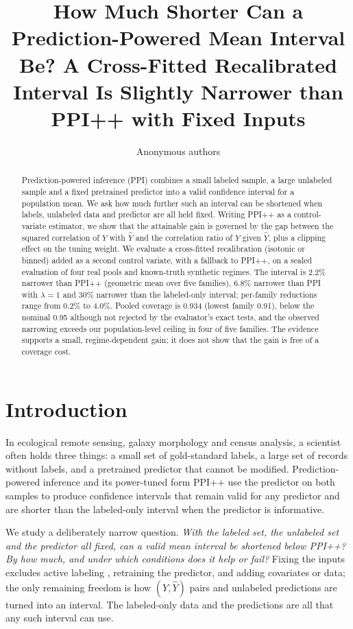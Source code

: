 \documentclass{article}
\title{How Much Shorter Can a Prediction-Powered Mean Interval Be? A Cross-Fitted Recalibrated Interval Is Slightly Narrower than PPI++ with Fixed Inputs}
\author{Anonymous authors}
\newcommand{\Yhat}{\hat Y}
\begin{document}
\maketitle

\begin{abstract}
Prediction-powered inference (PPI) combines a small labeled sample, a large unlabeled sample and a fixed pretrained predictor into a valid confidence interval for a population mean. We ask how much further such an interval can be shortened when labels, unlabeled data and predictor are all held fixed. Writing PPI++ as a control-variate estimator, we show that the attainable gain is governed by the gap between the squared correlation of $Y$ with $\Yhat$ and the correlation ratio of $Y$ given $\Yhat$, plus a clipping effect on the tuning weight. We evaluate a cross-fitted recalibration (isotonic or binned) added as a second control variate, with a fallback to PPI++, on a sealed evaluation of four real pools and known-truth synthetic regimes. The interval is 2.2\% narrower than PPI++ (geometric mean over five families), 6.8\% narrower than PPI with $\lambda{=}1$ and 30\% narrower than the labeled-only interval; per-family reductions range from 0.2\% to 4.0\%. Pooled coverage is 0.934 (lowest family 0.91), below the nominal 0.95 although not rejected by the evaluator's exact tests, and the observed narrowing exceeds our population-level ceiling in four of five families. The evidence supports a small, regime-dependent gain; it does not show that the gain is free of a coverage cost.
\end{abstract}

\section{Introduction}
In ecological remote sensing, galaxy morphology and census analysis, a scientist often holds three things: a small set of gold-standard labels, a large set of records without labels, and a pretrained predictor that cannot be modified. Prediction-powered inference \citep{Angelopoulos2023PredictionpoweredI} and its power-tuned form PPI++ \citep{Angelopoulos2023PPIEP} use the predictor on both samples to produce confidence intervals that remain valid for any predictor and are shorter than the labeled-only interval when the predictor is informative.

We study a deliberately narrow question. \emph{With the labeled set, the unlabeled set and the predictor all fixed, can a valid mean interval be shortened below PPI++? By how much, and under which conditions does it help or fail?} Fixing the inputs excludes active labeling \citep{Zrnic2024ActiveSI}, retraining the predictor, and adding covariates or data; the only remaining freedom is how $(Y,\Yhat)$ pairs and unlabeled predictions are turned into an interval. The labeled-only data and the predictions are all that any such interval can use.
\end{document}
